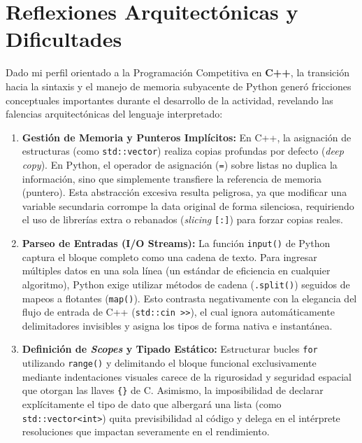 \documentclass[11pt]{article}
\begin{document}
\section{Reflexiones Arquitectónicas y Dificultades}

Dado mi perfil orientado a la Programación Competitiva en \textbf{C++}, la transición hacia la sintaxis y el manejo de memoria subyacente de Python generó fricciones conceptuales importantes durante el desarrollo de la actividad, revelando las falencias arquitectónicas del lenguaje interpretado:

\begin{enumerate}
	\item \textbf{Gestión de Memoria y Punteros Implícitos:} En C++, la asignación de estructuras (como \texttt{std::vector}) realiza copias profundas por defecto (\textit{deep copy}). En Python, el operador de asignación (\texttt{=}) sobre listas no duplica la información, sino que simplemente transfiere la referencia de memoria (puntero). Esta abstracción excesiva resulta peligrosa, ya que modificar una variable secundaria corrompe la data original de forma silenciosa, requiriendo el uso de librerías extra o rebanados (\textit{slicing} \texttt{[:]}) para forzar copias reales.

	\item \textbf{Parseo de Entradas (I/O Streams):} La función \texttt{input()} de Python captura el bloque completo como una cadena de texto. Para ingresar múltiples datos en una sola línea (un estándar de eficiencia en cualquier algoritmo), Python exige utilizar métodos de cadena (\texttt{.split()}) seguidos de mapeos a flotantes (\texttt{map()}). Esto contrasta negativamente con la elegancia del flujo de entrada de C++ (\texttt{std::cin \textgreater\textgreater}), el cual ignora automáticamente delimitadores invisibles y asigna los tipos de forma nativa e instantánea.

	\item \textbf{Definición de \textit{Scopes} y Tipado Estático:} Estructurar bucles \texttt{for} utilizando \texttt{range()} y delimitando el bloque funcional exclusivamente mediante indentaciones visuales carece de la rigurosidad y seguridad espacial que otorgan las llaves \texttt{\{\}} de C. Asimismo, la imposibilidad de declarar explícitamente el tipo de dato que albergará una lista (como \texttt{std::vector\textless int\textgreater}) quita previsibilidad al código y delega en el intérprete resoluciones que impactan severamente en el rendimiento.
\end{enumerate}
\end{document}
